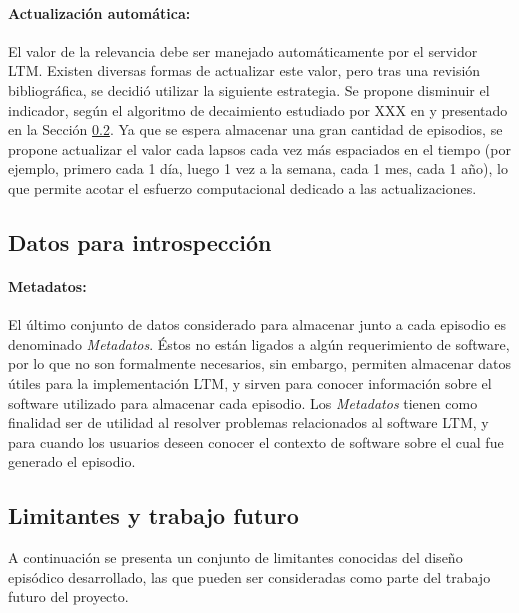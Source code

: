 \paragraph{Actualización automática:}
El valor de la relevancia debe ser manejado automáticamente por el servidor LTM. Existen diversas formas de actualizar este valor, pero tras una revisión bibliográfica, se decidió utilizar la siguiente estrategia. Se propone disminuir el indicador, según el algoritmo de decaimiento estudiado por XXX en \cite{} y presentado en la Sección \ref{}. Ya que se espera almacenar una gran cantidad de episodios, se propone actualizar el valor cada lapsos cada vez más espaciados en el tiempo (por ejemplo, primero cada 1 día, luego 1 vez a la semana, cada 1 mes, cada 1 año), lo que permite acotar el esfuerzo computacional dedicado a las actualizaciones.




\subsection{Datos para introspección}

\paragraph{Metadatos:}
El último conjunto de datos considerado para almacenar junto a cada episodio es denominado \textit{Metadatos}. Éstos no están ligados a algún requerimiento de software, por lo que no son formalmente necesarios, sin embargo, permiten almacenar datos útiles para la implementación LTM, y sirven para conocer información sobre el software utilizado para almacenar cada episodio. Los \textit{Metadatos} tienen como finalidad ser de utilidad al resolver problemas relacionados al software LTM, y para cuando los usuarios deseen conocer el contexto de software sobre el cual fue generado el episodio.



\subsection{Limitantes y trabajo futuro}


A continuación se presenta un conjunto de limitantes conocidas del diseño episódico desarrollado, las que pueden ser consideradas como parte del trabajo futuro del proyecto.

